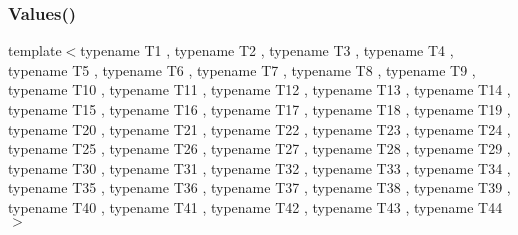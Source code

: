 \mbox{\label{namespacetesting_a42848f3794e196c5a74f4b21db0752dd}} 
\subsubsection{\texorpdfstring{Values()}{Values()}\hspace{0.1cm}{\footnotesize\ttfamily [45/51]}}
{\footnotesize\ttfamily template$<$typename T1 , typename T2 , typename T3 , typename T4 , typename T5 , typename T6 , typename T7 , typename T8 , typename T9 , typename T10 , typename T11 , typename T12 , typename T13 , typename T14 , typename T15 , typename T16 , typename T17 , typename T18 , typename T19 , typename T20 , typename T21 , typename T22 , typename T23 , typename T24 , typename T25 , typename T26 , typename T27 , typename T28 , typename T29 , typename T30 , typename T31 , typename T32 , typename T33 , typename T34 , typename T35 , typename T36 , typename T37 , typename T38 , typename T39 , typename T40 , typename T41 , typename T42 , typename T43 , typename T44 $>$ \\
}
